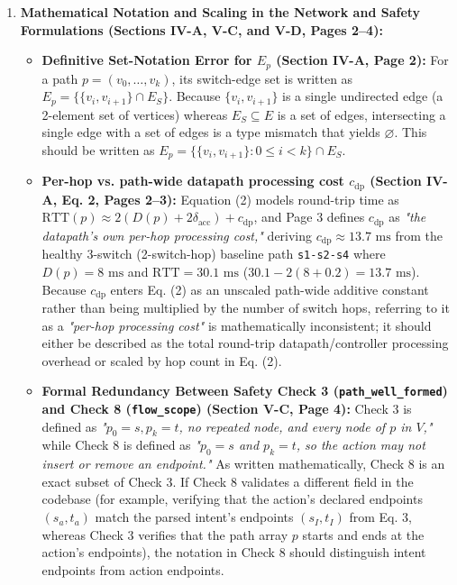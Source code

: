 \documentclass[11pt,a4paper]{article}
\begin{document}
\begin{enumerate}[leftmargin=1.6em,itemsep=3pt]
\item \textbf{Mathematical Notation and Scaling in the Network and Safety Formulations (Sections IV-A, V-C, and V-D, Pages 2–4):}
\begin{itemize}[leftmargin=1.8em,itemsep=2pt]
\item \textbf{Definitive Set-Notation Error for $E_p$ (Section IV-A, Page 2):} For a path $p = (v_0, \dots, v_k)$, its switch-edge set is written as $E_p = \{\{v_i, v_{i+1}\} \cap E_S\}$. Because $\{v_i, v_{i+1}\}$ is a single undirected edge (a 2-element set of vertices) whereas $E_S \subseteq E$ is a set of edges, intersecting a single edge with a set of edges is a type mismatch that yields $\varnothing$. This should be written as $E_p = \{\{v_i, v_{i+1}\} : 0 \le i < k\} \cap E_S$.
\item \textbf{Per-hop vs. path-wide datapath processing cost $c_{\text{dp}}$ (Section IV-A, Eq. 2, Pages 2–3):} Equation (2) models round-trip time as $\text{RTT}(p) \approx 2(D(p) + 2\delta_{\text{acc}}) + c_{\text{dp}}$, and Page 3 defines $c_{\text{dp}}$ as \emph{"the datapath's own per-hop processing cost,"} deriving $c_{\text{dp}} \approx 13.7\text{ ms}$ from the healthy 3-switch (2-switch-hop) baseline path \texttt{s1-s2-s4} where $D(p) = 8\text{ ms}$ and $\text{RTT} = 30.1\text{ ms}$ ($30.1 - 2(8 + 0.2) = 13.7\text{ ms}$). Because $c_{\text{dp}}$ enters Eq. (2) as an unscaled path-wide additive constant rather than being multiplied by the number of switch hops, referring to it as a \emph{"per-hop processing cost"} is mathematically inconsistent; it should either be described as the total round-trip datapath/controller processing overhead or scaled by hop count in Eq. (2).
\item \textbf{Formal Redundancy Between Safety Check 3 (\texttt{path\_well\_formed}) and Check 8 (\texttt{flow\_scope}) (Section V-C, Page 4):} Check 3 is defined as \emph{"$p_0 = s, p_k = t$, no repeated node, and every node of $p$ in $V$,"} while Check 8 is defined as \emph{"$p_0 = s$ and $p_k = t$, so the action may not insert or remove an endpoint."} As written mathematically, Check 8 is an exact subset of Check 3. If Check 8 validates a different field in the codebase (for example, verifying that the action's declared endpoints $(s_a, t_a)$ match the parsed intent's endpoints $(s_I, t_I)$ from Eq. 3, whereas Check 3 verifies that the path array $p$ starts and ends at the action's endpoints), the notation in Check 8 should distinguish intent endpoints from action endpoints.

\end{itemize}
\end{enumerate}
\end{document}
